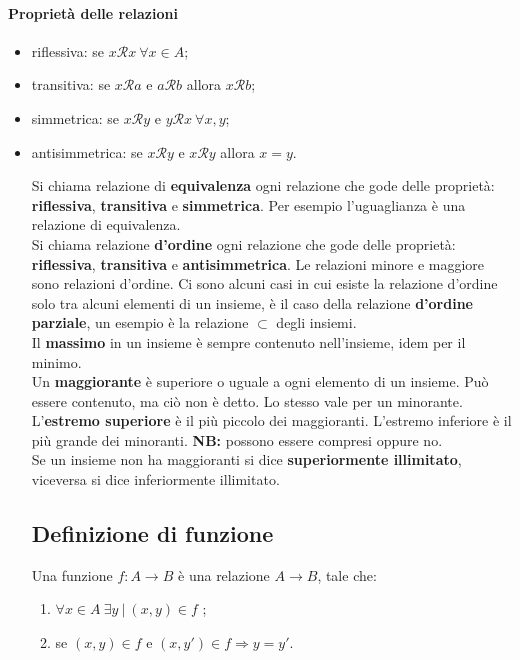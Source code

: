 \documentclass{article}
\begin{document}
\paragraph{Proprietà delle relazioni}
\begin{itemize}
	\item riflessiva: se $x \mathcal{R} x \ \forall x \in A$;
	\item transitiva: se $x \mathcal{R} a$ e $a \mathcal{R} b$ allora $x \mathcal{R} b$;
	\item simmetrica: se $x \mathcal{R} y$ e $y \mathcal{R} x \ \forall x,y$;
	\item antisimmetrica: se $x \mathcal{R} y$ e $x \mathcal{R} y$ allora $x = y$.

Si chiama relazione di \textbf{equivalenza} ogni relazione che gode delle proprietà:
\textbf{riflessiva}, \textbf{transitiva} e \textbf{simmetrica}. Per esempio l'uguaglianza è una relazione
di equivalenza.\\

Si chiama relazione \textbf{d'ordine} ogni relazione che gode delle proprietà: \textbf{riflessiva}, \textbf{transitiva} e
\textbf{antisimmetrica}. Le relazioni minore e maggiore sono relazioni d'ordine.
Ci sono alcuni casi in cui esiste la relazione d'ordine solo tra alcuni elementi di un insieme,
è il caso della relazione \textbf{d'ordine parziale}, un esempio è la relazione $ \subset $ degli insiemi.\\

Il \textbf{massimo} in un insieme è sempre contenuto nell'insieme, idem per il minimo.\\
Un \textbf{maggiorante} è superiore o uguale a ogni elemento di un insieme. Può essere contenuto, ma ciò non è detto.
Lo stesso vale per un minorante. \\
L'\textbf{estremo superiore} è il più piccolo dei maggioranti. L'estremo inferiore è il più
grande dei minoranti. \textbf{NB:} possono essere compresi oppure no.\\
Se un insieme non ha maggioranti si dice \textbf{superiormente illimitato}, viceversa si dice
inferiormente illimitato.

\subsection{Definizione di funzione}
Una funzione $ f: A \rightarrow B $ è una relazione $ A \rightarrow B$, tale che:

\begin{enumerate}
	\item $ \forall x \in A \ \exists y \ | \ (x,y) \in f$ ;
	\item se $(x,y) \in f$ e $(x, y') \in f \Rightarrow y= y' $.


\end{enumerate}
\end{itemize}
\end{document}
